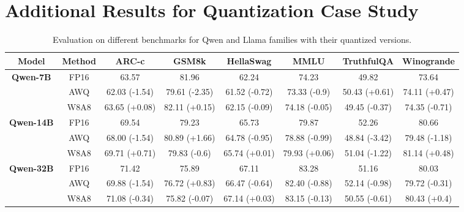\section{Additional Results for Quantization Case Study}
\label{sec:appendix_quant}

\begin{table*}[!t]
\centering
\caption{Evaluation on different benchmarks for Qwen and Llama families with their quantized versions.}
\label{tab:benchmark_quant}
\begin{adjustbox}{width=\textwidth}
\normalsize
\begin{tabular}{c|c|c|c|c|c|c|c}
\toprule
\textbf{Model} & \textbf{Method}  & \textbf{ARC-c} & \textbf{GSM8k } & \textbf{HellaSwag} & \textbf{MMLU } & \textbf{TruthfulQA} & \textbf{Winogrande}  \\
\midrule
\multirow{3}{*}{\textbf{Qwen-7B}} & FP16  & 63.57 & 81.96 & 62.24 & 74.23 & 49.82 & 73.64 \\
 & AWQ  & 62.03 {\color{red} (-1.54)} & 79.61 {\color{red} (-2.35)} & 61.52 {\color{red} (-0.72)} & 73.33 {\color{red} (-0.9)} & 50.43 {\color{green} (+0.61)} & 74.11 {\color{green} (+0.47)} \\
 & W8A8  & 63.65 {\color{green} (+0.08)} & 82.11 {\color{green} (+0.15)} & 62.15 {\color{red} (-0.09)} & 74.18 {\color{red} (-0.05)} & 49.45 {\color{red} (-0.37)} & 74.35 {\color{red} (-0.71)} \\
\hline
\multirow{3}{*}{\textbf{Qwen-14B}} & FP16  & 69.54  & 79.23 & 65.73 & 79.87 & 52.26 & 80.66 \\
 & AWQ   & 68.00 {\color{red} (-1.54)}& 80.89{\color{green} (+1.66)} & 64.78 {\color{red} (-0.95)} & 78.88 {\color{red} (-0.99)} & 48.84 {\color{red} (-3.42)} & 79.48 {\color{red} (-1.18)} \\
 & W8A8  & 69.71 {\color{green} (+0.71)} & 79.83 {\color{red} (-0.6)} & 65.74 {\color{green} (+0.01)} & 79.93 {\color{green} (+0.06)} & 51.04 {\color{red} (-1.22)} & 81.14 {\color{green} (+0.48)} \\
\hline
\multirow{3}{*}{\textbf{Qwen-32B}} & FP16  & 71.42  & 75.89 & 67.11 & 83.28 & 51.16 & 80.03 \\
 & AWQ   & 69.88 {\color{red} (-1.54)}& 76.72{\color{green} (+0.83)} & 66.47 {\color{red} (-0.64)} & 82.40 {\color{red} (-0.88)} & 52.14 {\color{red} (-0.98)} & 79.72 {\color{red} (-0.31)} \\
 & W8A8  & 71.08 {\color{red} (-0.34)} & 75.82 {\color{red} (-0.07)} & 67.14 {\color{green} (+0.03)} & 83.15 {\color{red} (-0.13)} & 50.55 {\color{red} (-0.61)} & 80.43 {\color{green} (+0.4)} \\

\end{tabular}
\end{adjustbox}
\end{table*}
